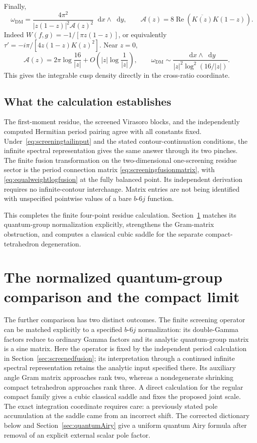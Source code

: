 \documentclass[11pt,a4paper]{article}
\numberwithin{equation}{section}
\theoremstyle{definition}
\theoremstyle{remark}
\newcommand{\dd}{\mathop{}\!\mathrm d}
\begin{document}
Finally,
\begin{equation}
 \boxed{\quad
 \omega_{\mathrm{DM}}
 =\frac{4\pi^2}{|z(1-z)|^2\mathcal A(z)^2}\dd x\wedge\dd y,
 \qquad
 \mathcal A(z)=8\operatorname{Re}(\overline{K(z)}K(1-z)).
 \quad}
 \label{eq:equalweightdensityexplicit}
\end{equation}
Indeed $W(f,g)=-1/[\pi z(1-z)]$, or equivalently
$\tau'=-i\pi/[4z(1-z)K(z)^2]$.
Near $z=0$,
\[
 \mathcal A(z)=2\pi\log\frac{16}{|z|}
          +O\left(|z|\log\frac1{|z|}\right),\qquad
 \omega_{\mathrm{DM}}\sim
 \frac{\dd x\wedge\dd y}
      {|z|^2\log^2(16/|z|)}.
\]
This gives the integrable cusp density directly in the
cross-ratio coordinate.

\subsection{What the calculation establishes}

The first-moment residue, the screened Virasoro blocks, and the
independently computed Hermitian period pairing agree with all
constants fixed. Under~\eqref{eq:screeningtailinput} and the stated
contour-continuation conditions, the infinite spectral representation
gives the same answer through its two pinches. The finite fusion
transformation on the two-dimensional one-screening residue sector
is the period connection matrix
\eqref{eq:screeningfusionmatrix}, with
\eqref{eq:equalweightlogfusion} at the fully balanced point.
Its independent derivation requires no infinite-contour interchange.
Matrix entries are not
being identified with unspecified pointwise values of a
bare $b$-$6j$ function.

This completes the finite four-point residue calculation.
Section~\ref{sec:normalizedsixj} matches its quantum-group
normalization explicitly, strengthens the Gram-matrix
obstruction, and computes a classical cubic saddle for the
separate compact-tetrahedron degeneration.

\section{The normalized quantum-group comparison and the compact limit}
\label{sec:normalizedsixj}

The further comparison has two distinct outcomes. The finite
screening operator can be matched explicitly to a specified
$b$-$6j$ normalization: its double-Gamma factors reduce to
ordinary Gamma factors and its analytic quantum-group matrix
is a sine matrix. Here the operator is fixed by the independent
period calculation in Section~\ref{sec:screenedfusion}; its
interpretation through a continued infinite spectral representation
retains the analytic input specified there. Its auxiliary angle Gram matrix
approaches rank two, whereas a nondegenerate shrinking compact
tetrahedron approaches rank three. A direct calculation for
the regular compact family gives a cubic classical saddle
and fixes the proposed joint scale. The exact integration coordinate
requires care: a previously stated pole accumulation at the saddle
came from an incorrect shift. The corrected dictionary below and
Section~\ref{sec:quantumAiry} give a uniform quantum Airy formula
after removal of an explicit external scalar pole factor.
\end{document}

